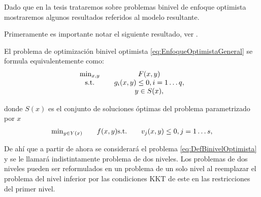 Dado que en la tesis trataremos sobre problemas binivel de enfoque optimista mostraremos algunos resultados referidos al modelo resultante.

Primeramente es importante notar el siguiente resultado, ver \cite{Scmidtbiblio}.

\begin{proposition} El problema de optimización binivel optimista \eqref{eq:EnfoqueOptimistaGeneral} se formula equivalentemente como:
\begin{equation}\label{eq:DefBinivelOptimista} 
\begin{matrix}
    \min_{x , y} & \quad F(x, y) \notag \\
    \text{s.t.} & \quad g_i(x, y) \leq 0, i=1\ldots q,  \notag \\
    & \quad y \in S(x), \end{matrix}\end{equation}
  
donde $S(x)$ es el conjunto de soluciones óptimas del problema parametrizado por $x$ 
 \begin{equation}
\begin{matrix}   \min_{y \in Y(x)} & \quad f(x, y)  
    \text{s.t.} & \quad v_j(x, y) \leq 0, j=1\ldots s, \notag \end{matrix}\end{equation}


\end{proposition}
De ah\'i  que a partir de ahora se considerar\'a el problema \eqref{eq:DefBinivelOptimista} y se le llamar\'a indistintamente problema de dos niveles. 
Los  problemas de dos niveles pueden ser reformulados en un problema de un solo nivel al reemplazar el problema del nivel inferior por las condiciones KKT de este en las restricciones del primer nivel. 
		
        
